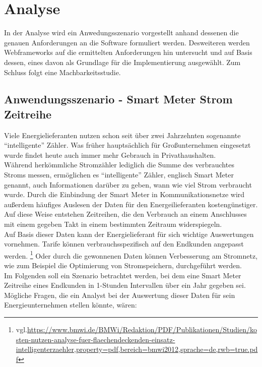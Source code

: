 \documentclass[12pt]{article}
\begin{document}
	\newpage	
		
\section{Analyse}
	In der Analyse wird ein Anwedungsszenario vorgestellt anhand dessenen die
	genauen Anforderungen an die Software formuliert werden. Desweiteren werden
	Webframeworks auf die ermittelten Anforderungen hin untersucht und auf Basis
	dessen, eines davon als Grundlage für die Implementierung ausgewählt. Zum
	Schluss folgt eine Machbarkeitsstudie.

	\subsection{Anwendungsszenario - Smart Meter Strom Zeitreihe}
			Viele Energielieferanten nutzen schon seit über zwei Jahrzehnten sogenannte
			"`intelligente"' Zähler. Was früher hauptsächlich für Großunternehmen
			eingesetzt wurde findet heute auch immer mehr Gebrauch in
			Privathaushalten.\\[0.3cm]
			Während herkömmliche Stromzähler lediglich die Summe des verbrauchtes Stroms
			messen, ermöglichen es "`intelligente"' Zähler, englisch Smart Meter
			genannt, auch Informationen darüber zu geben, wann wie viel Strom verbraucht
			wurde. Durch die Einbindung der Smart Meter in Kommunikationsnetze wird
			außerdem häufiges Auslesen der Daten für den Energeilieferanten
			kostengünstiger. Auf diese Weise entstehen Zeitreihen, die den Verbrauch
			an einem Anschlusses mit einem gegeben Takt in einem bestimmten Zeitraum
			widerspiegeln.\\[0.3cm]
			Auf Basis dieser Daten kann der Energielieferant für sich wichtige
			Auswertungen vornehmen. Tarife können verbrauchsspezifisch auf den Endkunden
			angepasst werden.
			\footnote{vgl.\url{https://www.bmwi.de/BMWi/Redaktion/PDF/Publikationen/Studien/kosten-nutzen-analyse-fuer-flaechendeckenden-einsatz-intelligenterzaehler,property=pdf,bereich=bmwi2012,sprache=de,rwb=true.pdf}}
			Oder durch die gewonnenen Daten können Verbesserung am Stromnetz, wie
			zum Beispiel die Optimierung von Stromspeichern, durchgeführt
			werden.\\[0.3cm]
			Im Folgenden soll ein Szenario betrachtet werden, bei dem eine Smart Meter
			Zeitreihe eines Endkunden in 1-Stunden Intervallen über ein Jahr gegeben
			sei. Mögliche Fragen, die ein Analyst bei der Auswertung dieser Daten für
			sein Energieunternehmen stellen könnte, wären:
			
\end{document}
